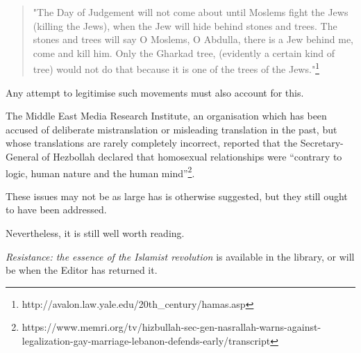 \documentclass[10pt,a4paper]{article}
\newcounter{count}
\begin{document}
\begin{multicols}{2}
	\begin{quote}
		"The Day of Judgement will not come about until Moslems fight the Jews
		(killing the Jews), when the Jew will hide behind stones and trees. The
		stones and trees will say O Moslems, O Abdulla, there is a Jew behind
		me, come and kill him. Only the Gharkad tree, (evidently a certain kind
		of tree) would not do that because it is one of the trees of the
		Jews."\footnote{http://avalon.law.yale.edu/20th\_century/hamas.asp}
	\end{quote}
	
	Any attempt to legitimise such movements must also account for this.
	
	The Middle East Media Research Institute, an organisation which has been
	accused of deliberate mistranslation or misleading translation in the
	past, but whose translations are rarely completely incorrect, reported
	that the Secretary-General of Hezbollah declared that homosexual
	relationships were ``contrary to logic, human nature and the human
	mind''\footnote{https://www.memri.org/tv/hizbullah-sec-gen-nasrallah-warns-against-legalization-gay-marriage-lebanon-defends-early/transcript}.
	
	These issues may not be as large has is otherwise suggested, but they
	still ought to have been addressed.
	
	Nevertheless, it is still well worth reading.
	
	\textit{Resistance: the essence of the Islamist revolution} is available
	in the library, or will be when the Editor has returned it.
	
\end{multicols}
\end{document}

